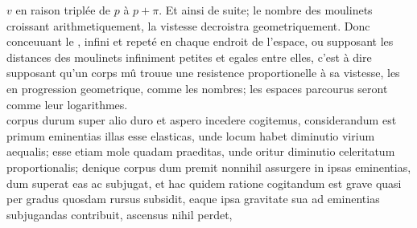 %
%
$\displaystyle v$ en raison tripl\'{e}e de $\displaystyle p$ \`{a} $\displaystyle p + \pi$. Et ainsi de suite; le nombre des moulinets croissant arithmetiquement, la vistesse decroistra geometriquement. Donc conceuuant le
,
infini et repet\'{e} en chaque endroit de l'espace, ou supposant les distances des moulinets infiniment petites et egales entre elles, c'est \`{a} dire supposant qu'un corps mû trouue une resistence\protect{} proportionelle \`{a} sa vistesse, les
en progression geometrique, 
comme les nombres; les espaces parcourus\protect{} seront comme leur logarithmes.\\
\pend
\pstart
{}
\pend
\pstart
%
%
\noindent{}
corpus durum super alio duro et aspero incedere cogitemus, considerandum est primum eminentias illas esse elasticas, unde locum habet diminutio virium\protect{} aequalis; esse etiam mole quadam praeditas, unde oritur diminutio celeritatum\protect{} proportionalis; denique corpus dum premit nonnihil assurgere in ipsas eminentias, dum superat eas ac subjugat, et hac quidem ratione cogitandum est grave quasi per gradus quosdam
rursus subsidit, eaque ipsa gravitate sua ad eminentias subjugandas contribuit, ascensus nihil perdet,
